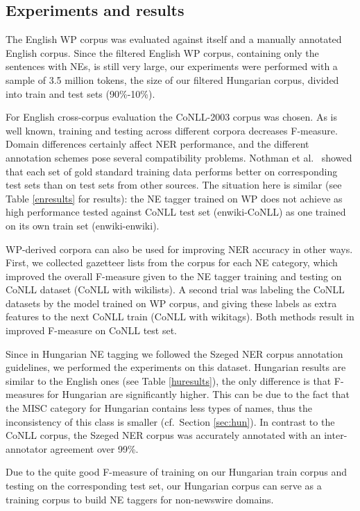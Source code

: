 \documentclass[11pt]{article}
\begin{document}
\subsection{Experiments and results}

The English WP corpus was evaluated against itself and a manually annotated
English corpus. Since the filtered English WP corpus, containing only the
sentences with NEs, is still very large, our experiments were performed with a
sample of 3.5 million tokens, the size of our filtered Hungarian corpus,
divided into train and test sets (90\%-10\%).

For English cross-corpus evaluation the CoNLL-2003 corpus was chosen. As is
well known, training and testing across different corpora decreases
F-measure. Domain differences certainly affect NER performance, and the
different annotation schemes pose several compatibility problems. Nothman et
al.~ showed that each set of gold standard training data
performs better on corresponding test sets than on test sets from other
sources. The situation here is similar (see Table \ref{enresults} for
results): the NE tagger trained on WP does not achieve as high performance
tested against CoNLL test set (enwiki-CoNLL) as one trained on its own train
set (enwiki-enwiki).

WP-derived corpora can also be used for improving NER accuracy in other
ways. First, we collected gazetteer lists from the corpus for each NE
category, which improved the overall F-measure given to the NE tagger training
and testing on CoNLL dataset (CoNLL with wikilists). A second trial was
labeling the CoNLL datasets by the model trained on WP corpus, and giving
these labels as extra features to the next CoNLL train (CoNLL with
wikitags). Both methods result in improved F-measure on CoNLL test set.

Since in Hungarian NE tagging we followed the Szeged NER corpus annotation
guidelines, we performed the experiments on this dataset. Hungarian results
are similar to the English ones (see Table \ref{huresults}), the only
difference is that F-measures for Hungarian are significantly higher. This can
be due to the fact that the MISC category for Hungarian contains less types of
names, thus the inconsistency of this class is smaller (cf.~Section
\ref{sec:hun}). In contrast to the CoNLL corpus, the Szeged NER corpus was
accurately annotated with an inter-annotator agreement over 99\%.

Due to the quite good F-measure of training on our Hungarian train corpus and
testing on the corresponding test set, our Hungarian corpus can serve as a
training corpus to build NE taggers for non-newswire domains.
\end{document}
